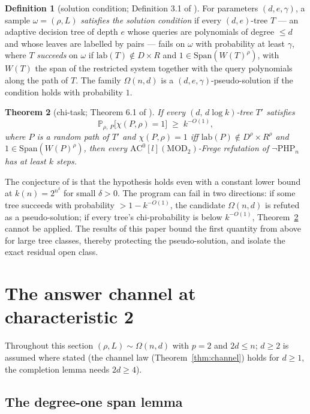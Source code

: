 \documentclass[11pt]{article}
\newtheorem{theorem}{Theorem}[section]
\theoremstyle{definition}
\newtheorem{definition}[theorem]{Definition}
\theoremstyle{remark}
\newcommand{\PHPn}{\neg\mathrm{PHP}_n}
\newcommand{\Sp}{\mathrm{Span}}
\newcommand{\Prob}{\mathbb{P}}
\newcommand{\AC}{\mathrm{AC}}
\newcommand{\lab}{\mathrm{lab}}
\begin{document}
\begin{definition}[solution condition; Definition 3.1 of \cite{Kra26}]
\label{def:solution}
For parameters $(d,e,\gamma)$, a sample $\omega=(\rho,L)$ \emph{satisfies
the solution condition} if every $(d,e)$-tree $T$ --- an adaptive
decision tree of depth $e$ whose queries are polynomials of degree
$\le d$ and whose leaves are labelled by pairs --- fails on $\omega$ with
probability at least $\gamma$, where $T$ \emph{succeeds} on $\omega$ if
$\lab(T)\notin D\times R$ and $1\in\Sp(W(T)^\rho)$, with $W(T)$ the span
of the restricted system together with the query polynomials along the
path of $T$.  The family $\Omega(n,d)$ is a $(d,e,\gamma)$-pseudo-solution
if the condition holds with probability $1$.
\end{definition}

\begin{theorem}[chi-task; Theorem 6.1 of \cite{Kra26}]\label{thm:chi}
If every $(d,\,d\log k)$-tree $T'$ satisfies
\[
\Prob_{\rho,\,P}\bigl[\chi(P,\rho)=1\bigr]\;\ge\;k^{-O(1)},
\]
where $P$ is a random path of $T'$ and $\chi(P,\rho)=1$ iff
$\lab(P)\notin D^\rho\times R^\rho$ and $1\in\Sp(W(P)^\rho)$, then every
$\AC^0[l](\mathrm{MOD}_2)$-Frege refutation of $\PHPn$ has at least $k$
steps.
\end{theorem}

The conjecture of \cite{Kra26} is that the hypothesis holds even with a
constant lower bound at $k(n)=2^{n^\delta}$ for small $\delta>0$.  The
program can fail in two directions: if some tree succeeds with
probability $>1-k^{-O(1)}$, the candidate $\Omega(n,d)$ is refuted as a
pseudo-solution; if every tree's chi-probability is below $k^{-O(1)}$,
Theorem~\ref{thm:chi} cannot be applied.  The results of this paper bound
the first quantity from above for large tree classes, thereby protecting
the pseudo-solution, and isolate the exact residual open class.

\section{The answer channel at characteristic 2}\label{sec:channel}

Throughout this section $(\rho,L)\sim\Omega(n,d)$ with $p=2$ and
$2d\le n$; $d\ge2$ is assumed where stated (the channel law
(Theorem~\ref{thm:channel}) holds for $d\ge1$, the completion lemma
needs $2d\ge4$).

\subsection{The degree-one span lemma}
\end{document}
